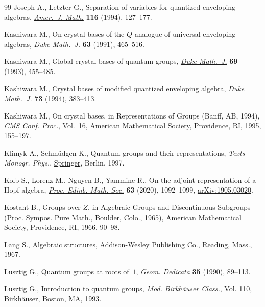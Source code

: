 \documentclass[11pt]{article}
\numberwithin{equation}{section}
\numberwithin{equation}{section}
\theoremstyle{definition}
\begin{document}
\begin{thebibliography}{99}
Joseph A., Letzter G., Separation of variables for quantized enveloping
 algebras, \href{https://doi.org/10.2307/2374984}{\textit{Amer.~J. Math.}} \textbf{116} (1994), 127--177.

Kashiwara M., On crystal bases of the {$Q$}-analogue of universal enveloping
 algebras, \href{https://doi.org/10.1215/S0012-7094-91-06321-0}{\textit{Duke Math.~J.}} \textbf{63} (1991), 465--516.

Kashiwara M., Global crystal bases of quantum groups, \href{https://doi.org/10.1215/S0012-7094-93-06920-7}{\textit{Duke Math.~J.}}
 \textbf{69} (1993), 455--485.

Kashiwara M., Crystal bases of modified quantized enveloping algebra,
 \href{https://doi.org/10.1215/S0012-7094-94-07317-1}{\textit{Duke Math.~J.}} \textbf{73} (1994), 383--413.

Kashiwara M., On crystal bases, in Representations of {G}roups ({B}anff, {AB},
 1994), \textit{CMS Conf. Proc.}, Vol.~16, American Mathematical Society,
 Providence, RI, 1995, 155--197.

Klimyk A., Schm\"udgen K., Quantum groups and their representations, \textit{Texts Monogr. Phys.}, \href{https://doi.org/10.1007/978-3-642-60896-4}{Springer}, Berlin, 1997.

Kolb S., Lorenz M., Nguyen B., Yammine R., On the adjoint representation of a
 {H}opf algebra, \href{https://doi.org/10.1017/S0013091520000358}{\textit{Proc. Edinb. Math. Soc.}} \textbf{63} (2020),
 1092--1099, \href{https://arxiv.org/abs/1905.03020}{arXiv:1905.03020}.

Kostant B., Groups over {$Z$}, in Algebraic {G}roups and {D}iscontinuous
 {S}ubgroups ({P}roc. {S}ympos. {P}ure {M}ath., {B}oulder, {C}olo., 1965),
 American Mathematical Society, Providence, RI, 1966, 90--98.

Lang S., Algebraic structures, Addison-Wesley Publishing Co., Reading, Mass.,
 1967.

Lusztig G., Quantum groups at roots of~{$1$}, \href{https://doi.org/10.1007/BF00147341}{\textit{Geom. Dedicata}}
 \textbf{35} (1990), 89--113.

Lusztig G., Introduction to quantum groups, \textit{Mod. Birkh\"auser Class.},
 Vol. 110, \href{https://doi.org/10.1007/978-0-8176-4717-9}{Birkh\"auser}, Boston, MA, 1993.


\end{thebibliography}
\end{document}
